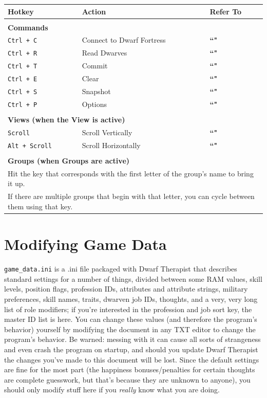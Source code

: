 \documentclass[]{article}
\begin{document}
\begin{tabular}{l l l}
\textbf{Hotkey} & \textbf{Action} & \textbf{Refer To}\\
\hline\\
\multicolumn{3}{l}{\textbf{Commands}}\\
\texttt{Ctrl + C} & Connect to Dwarf Fortress & \textbf{``\nameref{sec:Connecting to Dwarf Fortress}"}\\
\texttt{Ctrl + R} & Read Dwarves & \textbf{``\nameref{sec:Connecting to Dwarf Fortress}"}\\
\texttt{Ctrl + T} & Commit & \textbf{``\nameref{sec:Managing Your Dwarves}"}\\
\texttt{Ctrl + E} & Clear & \textbf{``\nameref{sec:Managing Your Dwarves}"}\\
\texttt{Ctrl + S} & Snapshot & \textbf{``\nameref{sec:Menu Bar}"}\\
\texttt{Ctrl + P} & Options & \textbf{``\nameref{sec:Options}"}\\
\hline\\
\multicolumn{3}{l}{\textbf{Views (when the View is active)}}\\
\texttt{Scroll} & Scroll Vertically & \textbf{``\nameref{sec:Labors View}"}\\
\texttt{Alt + Scroll} & Scroll Horizontally & \textbf{``\nameref{sec:Labors View}"}\\
\hline\\
\multicolumn{3}{l}{\textbf{Groups (when Groups are active)}}\\
\multicolumn{3}{l}{Hit the key that corresponds with the first letter of the group's name to bring it
up.}\\
\multicolumn{3}{l}{If there are multiple groups that begin with that letter, you can cycle between them
using that key.}
\end{tabular}

\section{Modifying Game Data}
\label{sec:Profession IDs}
\label{sec:Game Data}

\texttt{game\_data.ini} is a .ini file packaged with Dwarf Therapist that describes standard settings for
a number of things, divided between some RAM values, skill levels, position flags, profession IDs,
attributes and attribute strings, military preferences, skill names, traits, dwarven job IDs, thoughts,
and a very, very long list of role modifiers; if you're interested in the profession and job
sort key, the master ID list is here. You can change these values (and therefore the program's behavior)
yourself by modifying the document in any TXT editor to change the program's behavior. Be warned:
messing with it can cause all sorts of strangeness and even crash the program on startup, and should you
update Dwarf Therapist the changes you've made to this document will be lost. Since the default settings
are fine for the most part (the happiness bonuses/penalties for certain thoughts are complete guesswork,
but that's because they are unknown to anyone), you should only modify stuff here if you \emph{really}
know what you are doing.
\end{document}
